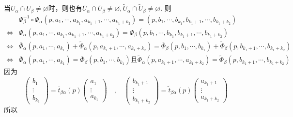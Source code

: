 当$U_{\alpha}\cap U_{\beta}\neq\varnothing$时，则也有$\overline{U}_{\alpha}\cap\overline{U}_{\beta}\neq\varnothing,\tilde{U}_{\alpha}\cap\tilde{U}_{\beta}\neq\varnothing$. 则
\[
\begin{split}
&\varPhi^{ -1}_{\beta}\circ\varPhi_{\alpha}(p,a_{1},\cdots,a_{k_{1}},a_{k_{1}+1},\cdots,a_{k_{1}+k_{2}})=(p,b_{1},\cdots,b_{k_{1}},b_{k_{1}+1},\cdots,b_{k_{1}+k_{2}})\\
\Leftrightarrow&\varPhi_{\alpha}(p,a_{1},\cdots,a_{k_{1}},a_{k_{1}+1},\cdots,a_{k_{1}+k_{2}})=\varPhi_{\beta}(p,b_{1},\cdots,b_{k_{1}},b_{k_{1}+1},\cdots,b_{k_{1}+k_{2}})\\
\Leftrightarrow&\overline{\varPhi}_{\alpha}(p,a_{1},\cdots,a_{k_{1}})+\tilde{\varPhi}_{\alpha}(p,a_{k_{1}+1},\cdots,a_{k_{1}+k_{2}})=\overline{\varPhi}_{\beta}(p,b_{1},\cdots,b_{k_{1}})+\tilde{\varPhi}_{\beta}(p,b_{k_{1}+1},\cdots,b_{k_{1}+k_{2}})\\
\Leftrightarrow&\overline{\varPhi}_{\alpha}(p,a_{1},\cdots,a_{k_{1}})=\overline{\varPhi}_{\beta}(p,b_{1},\cdots,b_{k_{1}})\text{且}\tilde{\varPhi}_{\alpha}(p,a_{k_{1}+1},\cdots,a_{k_{1}+k_{2}})=\tilde{\varPhi}_{\beta}(p,b_{k_{1}+1},\cdots,b_{k_{1}+k_{2}})
\end{split}
\]
因为
\[
\left( \begin{array}{ccc}{b_{1}} \\ {\vdots}  \\ {b_{k_{1}}} \end{array}\right)=\overline{t}_{\beta\alpha}(p) \left( \begin{array}{ccc}{a_{1}} \\ {\vdots}  \\ {a_{k_{1}}} \end{array}\right)\quad,\quad  \left( \begin{array}{ccc}{b_{k_{1}+1}} \\ {\vdots}  \\ {b_{k_{1}+k_{2}}} \end{array}\right)=\tilde{t}_{\beta\alpha}(p) \left( \begin{array}{ccc}{a_{k_{1}+1}} \\ {\vdots}  \\ {a_{k_{1}+k_{2}}} \end{array}\right)
\]
所以
